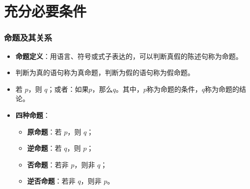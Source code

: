 \documentclass[aspectratio=169]{ctexbeamer} %
\begin{document}
\section{充分必要条件}
\begin{frame}
\frametitle{命题及其关系}
\begin{itemize}
\item \textbf{命题定义}：用语言、符号或式子表达的，可以判断真假的陈述句称为命题。
\item 判断为真的语句称为真命题，判断为假的语句称为假命题。
\item 若 \(p\)，则 \(q\)；或者：如果\(p\)，那么\(q\)。其中，\(p\)称为命题的条件，\(q\)称为命题的结论。
\item \textbf{四种命题}：
  \begin{itemize}
  \item \textbf{原命题}：若 \(p\)，则 \(q\)；
  \item \textbf{逆命题}：若 \(q\)，则 \(p\)；
  \item \textbf{否命题}：若非 \(p\)，则非 \(q\)；
  \item \textbf{逆否命题}：若非 \(q\)，则非 \(p\)。
  \end{itemize}
\end{itemize}
\end{frame}
\end{document}
